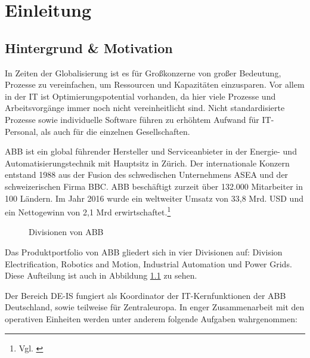 \chapter{Einleitung}

\section{Hintergrund \& Motivation}

In Zeiten der Globalisierung ist es für Großkonzerne von großer Bedeutung, Prozesse zu vereinfachen, um Ressourcen und Kapazitäten einzusparen. Vor allem in der \ac{IT} ist Optimierungspotential vorhanden, da hier viele Prozesse und Arbeitsvorgänge immer noch nicht vereinheitlicht sind.
Nicht standardisierte Prozesse sowie individuelle Software führen zu erhöhtem Aufwand für IT-Personal, als auch für die einzelnen Gesellschaften.

\ac{ABB} ist ein global f\"{u}hrender Hersteller und Serviceanbieter in der Energie- und Automatisierungstechnik mit Hauptsitz in Z\"{u}rich.
Der internationale Konzern entstand 1988 aus der Fusion des schwedischen Unternehmens \ac{ASEA} und der schweizerischen Firma \ac{BBC}. ABB besch\"{a}ftigt zurzeit \"{u}ber 132.000 Mitarbeiter in 100 L\"{a}ndern. Im Jahr 2016 wurde ein weltweiter Umsatz von 33,8 Mrd. USD und ein Nettogewinn von 2,1 Mrd erwirtschaftet.\footnote{Vgl. \cite{ABB.2017}} 




\begin{figure}[ht]
	\centering
	
	\caption{Divisionen von \acs{ABB}}
	\label{fig1}
	
\end{figure}

Das Produktportfolio von \ac{ABB} gliedert sich in vier Divisionen auf: Division Electrification, Robotics and Motion, Industrial Automation und Power Grids. Diese Aufteilung ist auch in Abbildung \ref{fig1} zu sehen.

Der Bereich \ac{DE-IS} fungiert als Koordinator der IT-Kernfunktionen der \ac{ABB} Deutschland, sowie teilweise für Zentraleuropa. In enger Zusammenarbeit mit den operativen Einheiten werden unter anderem folgende Aufgaben wahrgenommen:


